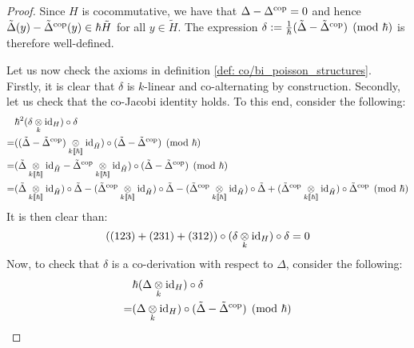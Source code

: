             \begin{proof}
                Since $H$ is cocommutative, we have that $\Delta - \Delta^{\mathrm{cop}} = 0$ and hence $\tilde{\Delta}(y) - \tilde{\Delta}^{\mathrm{cop}}(y) \in \hbar \tilde{H}$ for all $y \in \tilde{H}$. The expression $\delta := \frac{1}{\hbar}(\tilde{\Delta} - \tilde{\Delta}^{\mathrm{cop}}) \pmod{\hbar}$ is therefore well-defined.

                Let us now check the axioms in definition \ref{def: co/bi_poisson_structures}. Firstly, it is clear that $\delta$ is $k$-linear and co-alternating by construction. Secondly, let us check that the co-Jacobi identity holds. To this end, consider the following:
                    $$
                        \begin{aligned}
                            & \hbar^2 (\delta \tensor_k \id_H) \circ \delta
                            \\
                            = & ( (\tilde{\Delta} - \tilde{\Delta}^{\cop}) \tensor_{k[\![\hbar]\!]} \id_{\tilde{H}} ) \circ (\tilde{\Delta} - \tilde{\Delta}^{\cop}) \pmod{\hbar}
                            \\
                            = & ( \tilde{\Delta} \tensor_{k[\![\hbar]\!]} \id_{\tilde{H}} - \tilde{\Delta}^{\cop} \tensor_{k[\![\hbar]\!]} \id_{\tilde{H}} ) \circ (\tilde{\Delta} - \tilde{\Delta}^{\cop}) \pmod{\hbar}
                            \\
                            = & (\tilde{\Delta} \tensor_{k[\![\hbar]\!]} \id_{\tilde{H}}) \circ \tilde{\Delta} - (\tilde{\Delta}^{\cop} \tensor_{k[\![\hbar]\!]} \id_{\tilde{H}}) \circ \tilde{\Delta} - (\tilde{\Delta}^{\cop} \tensor_{k[\![\hbar]\!]} \id_{\tilde{H}}) \circ \tilde{\Delta} + (\tilde{\Delta}^{\cop} \tensor_{k[\![\hbar]\!]} \id_{\tilde{H}}) \circ \tilde{\Delta}^{\cop} \pmod{\hbar}
                        \end{aligned}
                    $$
                It is then clear than:
                    $$((123) + (231) + (312)) \circ (\delta \tensor_k \id_H) \circ \delta = 0$$
                Now, to check that $\delta$ is a co-derivation with respect to $\Delta$, consider the following:
                    $$
                        \begin{aligned}
                            & \hbar (\Delta \tensor_k \id_H) \circ \delta 
                            \\
                            = & (\Delta \tensor_k \id_H) \circ (\tilde{\Delta} - \tilde{\Delta}^{\cop}) \pmod{\hbar} 
                            \\

\end{aligned}$$
\end{proof}
